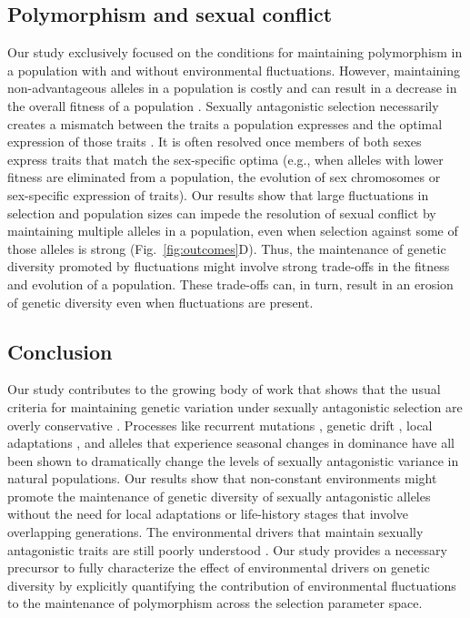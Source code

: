 \begin{refsection}
 \subsection*{Polymorphism and sexual conflict}

 Our study exclusively focused on the conditions for maintaining polymorphism in a population with and without environmental fluctuations. However, maintaining non-advantageous alleles in a population is costly and can result in a decrease in the overall fitness of a population \citep{gavrilets2014sexual,connallon2018environmental}. Sexually antagonistic selection necessarily creates a mismatch between the traits a population expresses and the optimal expression of those traits \citep{lande1980sexual}. It is often resolved once members of both sexes express traits that match the sex-specific optima (e.g., when alleles with lower fitness are eliminated from a population, the evolution of sex chromosomes or sex-specific expression of traits)\citep{lande1980sexual, arnqvist2013sexual}. Our results show that large fluctuations in selection and population sizes can impede the resolution of sexual conflict by maintaining multiple alleles in a population, even when selection against some of those alleles is strong (Fig.~\ref{fig:outcomes}D). Thus, the maintenance of genetic diversity promoted by fluctuations might involve strong trade-offs in the fitness and evolution of a population. These trade-offs can, in turn, result in an erosion of genetic diversity even when fluctuations are present.


 \subsection*{Conclusion}
Our study contributes to the growing body of work that shows that the usual criteria for maintaining genetic variation under sexually antagonistic selection are overly conservative \citep{connallon2012general,connallon_evolutionary_2019}. Processes like recurrent mutations \citep{radwan_maintenance_2008}, genetic drift \citep{connallon2012general}, local adaptations \citep{connallon_evolutionary_2019}, and alleles that experience seasonal changes in dominance \citep{wittmann2017seasonally} have all been shown to dramatically change the levels of sexually antagonistic variance in natural populations. Our results show that non-constant environments might promote the maintenance of genetic diversity of sexually antagonistic alleles without the need for local adaptations or life-history stages that involve overlapping generations. The environmental drivers that maintain sexually antagonistic traits are still poorly understood \citep{connallon2018environmental}. Our study provides a necessary precursor to fully characterize the effect of environmental drivers on genetic diversity by explicitly quantifying the contribution of environmental fluctuations to the maintenance of polymorphism across the selection parameter space.

\printbibliography
\end{refsection}

